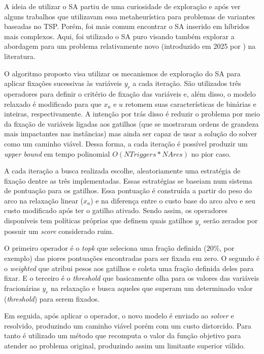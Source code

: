 A ideia de utilizar o SA partiu de uma curiosidade de exploração e após ver alguns trabalhos que utilizavam essa metaheurística para problemas de variantes baseadas no TSP. Porém, foi mais comum encontrar o SA inserido em híbridos mais complexos. Aqui, foi utilizado o SA puro visando também explorar a abordagem para um problema relativamente novo (introduzido em 2025 por \textcite{Carmine2025}) na literatura.

O algoritmo proposto visa utilizar os mecanismos de exploração do SA para aplicar fixações sucessivas às variáveis $y_r$ a cada iteração. São utilizados três operadores para definir o critério de fixação das variáveis e, além disso, o modelo relaxado é modificado para que $x_a$ e $u$ retomem suas características de binárias e inteiras, respectivamente. A intenção por trás disso é reduzir o problema por meio da fixação de variáveis ligadas aos gatilhos (que se mostraram ordens de grandeza mais impactantes nas instâncias) mas ainda ser capaz de usar a solução do solver como um caminho viável. Dessa forma, a cada iteração é possível produzir um \emph{upper bound} em tempo polinomial $O(NTriggers*NArcs)$ no pior caso.

A cada iteração a busca realizada escolhe, aleatoriamente uma estratégia de fixação dentre as três implementadas. Essas estratégias se baseiam num sistema de pontuação para os gatilhos. Essa pontuação é construída a partir do peso do arco na relaxação linear ($x_a$) e na diferença entre o custo base do arco alvo e seu custo modificado após ter o gatilho ativado. Sendo assim, os operadores disponíveis tem políticas próprias que definem quais gatilhos $y_r$ serão zerados por possuir um \emph{score} considerado ruim.

O primeiro operador é o \emph{topk} que seleciona uma fração definida ($20\%$, por exemplo) das piores pontuações encontradas para ser fixada em zero. O segundo é o \emph{weighted} que atribui pesos aos gatilhos e coleta uma fração definida deles para fixar. E o terceiro é o \emph{threshold} que basicamente olha para os valores das variáveis fracionárias $y_r$ na relaxação e busca aqueles que superam um determinado valor (\emph{threshold}) para serem fixados.

Em seguida, após aplicar o operador, o novo modelo é enviado ao \emph{solver} e resolvido, produzindo um caminho viável porém com um custo distorcido. Para tanto é utilizado um método que recomputa o valor da função objetivo para atender ao problema original, produzindo assim um limitante superior válido.

